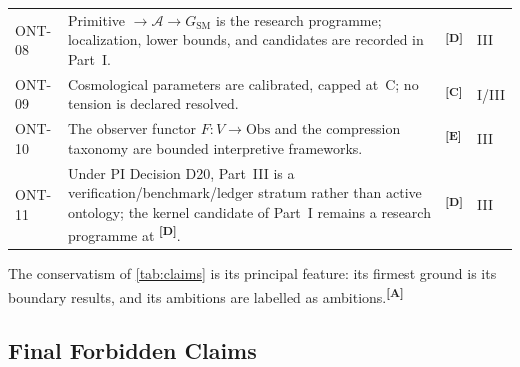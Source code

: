 \documentclass[12pt,a4paper,twoside]{article}
\theoremstyle{plain}
\theoremstyle{definition}
\theoremstyle{remark}
\newcommand{\catmark}[1]{\textsuperscript{\textsf{\textbf{[#1]}}}}
\begin{document}
{\begin{longtable}{p{} p{} p{} p{}}
ONT-08 & Primitive $\to\mathcal{A}\to G_{\mathrm{SM}}$ is the research programme; localization, lower bounds, and candidates are recorded in Part~I. & \catmark{D} & III \\
ONT-09 & Cosmological parameters are calibrated, capped at~C; no tension is declared resolved. & \catmark{C} & I/III \\
ONT-10 & The observer functor $F\colon V\to\mathrm{Obs}$ and the compression taxonomy are bounded interpretive frameworks. & \catmark{E} & III \\
ONT-11 & Under PI Decision D20, Part~III is a verification/benchmark/ledger stratum rather than active ontology; the kernel candidate of Part~I remains a research programme at \catmark{D}. & \catmark{D} & III \\
\end{longtable}
}

\noindent The conservatism of \cref{tab:claims} is its principal
feature: its firmest ground is its boundary results, and its ambitions
are labelled as ambitions.\catmark{A}

\subsection{Final Forbidden Claims}
\label{subsec:forbidden-claims}
\end{document}
